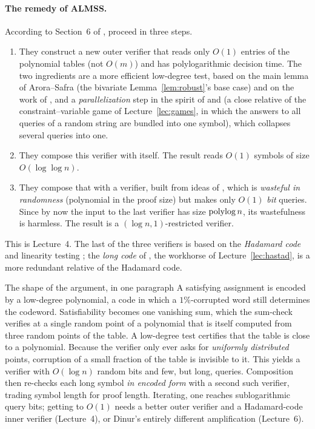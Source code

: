 \paragraph{The remedy of ALMSS.}  According to Section~6 of \citet{AroraSafra98}, \citet{ALMSS98} proceed in three steps.
\begin{enumerate}
  \item They construct a new outer verifier that reads only $O(1)$ entries of the polynomial tables (not $O(m)$) and has polylogarithmic decision time.  The two ingredients are a more efficient low-degree test, based on the
        main lemma of Arora--Safra (the bivariate Lemma~\ref{lem:robust}'s base case) and on the work of \citet{RubinfeldSudan92}, and a \emph{parallelization} step in the spirit of \citet{LapidotShamir91} and \citet{FeigeLovasz92}
        (a close relative of the constraint--variable game of Lecture~\ref{lec:games}, in which the answers to all queries of a random string are bundled into one symbol), which collapses several queries into one.
  \item They compose this verifier with itself.  The result reads $O(1)$ symbols of size $O(\log\log n)$.
  \item They compose that with a verifier, built from ideas of \citet{BLR90}, which is \emph{wasteful in randomness} (polynomial in the proof size) but makes only $O(1)$ \emph{bit} queries.  Since by now the input
        to the last verifier has size $\operatorname{polylog} n$, its wastefulness is harmless.  The result is a $(\log n,1)$-restricted verifier.
\end{enumerate}
This is Lecture~4.  The last of the three verifiers is based on the \emph{Hadamard code} and linearity testing \citep{BLR90}; the \emph{long code} of \citet{BGS98}, the workhorse of Lecture~\ref{lec:hastad}, is a more redundant relative of the Hadamard code.

\begin{bigpicture}{The shape of the argument, in one paragraph}
A satisfying assignment is encoded by a low-degree polynomial, a code in which a $1\%$-corrupted word still determines the codeword.  Satisfiability becomes one vanishing sum, which the sum-check verifies at a single random
point of a polynomial that is itself computed from three random points of the table.  A low-degree test certifies that the table is close to a polynomial.  Because the verifier only ever asks for \emph{uniformly distributed}
points, corruption of a small fraction of the table is invisible to it.  This yields a verifier with $O(\log n)$ random bits and few, but long, queries.  Composition then re-checks each long symbol \emph{in encoded form} with a second such verifier, trading
symbol length for proof length.  Iterating, one reaches sublogarithmic query bits; getting to $O(1)$ needs a better outer verifier and a Hadamard-code inner verifier (Lecture~4), or Dinur's entirely different amplification (Lecture~6).
\end{bigpicture}


